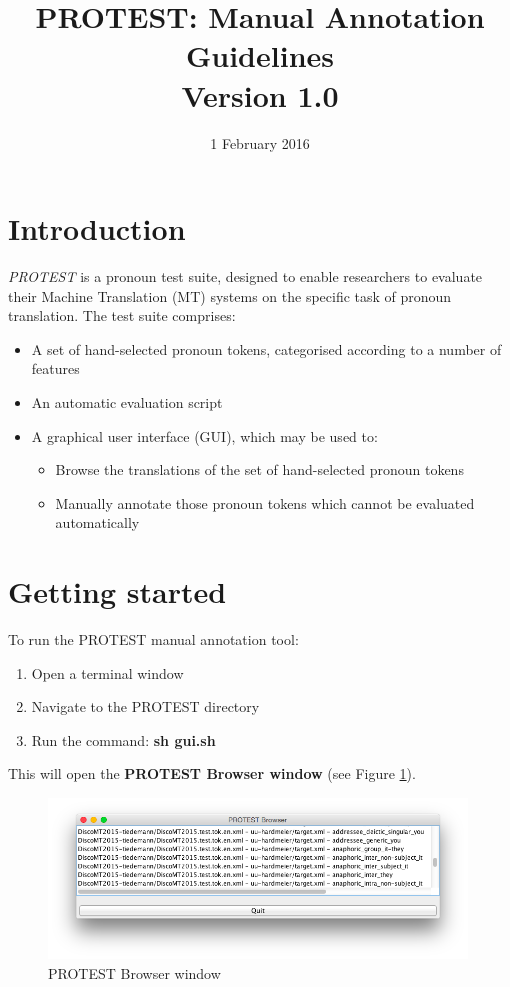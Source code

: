 \documentclass[11pt]{article} %
\title{PROTEST: Manual Annotation Guidelines\\Version 1.0}
\date{1 February 2016} %
\begin{document}
\maketitle

\section{Introduction}
\textit{PROTEST} is a pronoun test suite, designed to enable researchers to evaluate their Machine Translation (MT) systems on the specific task of pronoun translation. The test suite comprises:
\begin{itemize}
  \item A set of hand-selected pronoun tokens, categorised according to a number of features
  \item An automatic evaluation script
  \item A graphical user interface (GUI), which may be used to:
  \begin{itemize}
    \item Browse the translations of the set of hand-selected pronoun tokens
    \item Manually annotate those pronoun tokens which cannot be evaluated automatically
  \end{itemize}
\end{itemize}

\section{Getting started}
To run the PROTEST manual annotation tool:
\begin{enumerate}
  \item Open a terminal window
  \item Navigate to the PROTEST directory
  \item Run the command: \textbf{sh gui.sh}
\end{enumerate}

\noindent
This will open the \textbf{PROTEST Browser window} (see Figure \ref{fig:BrowserWindow}).

\begin{figure}[h!]
    \centering
    \includegraphics[width=0.99\textwidth]{PROTESTBrowserWindow.png}
    \caption{PROTEST Browser window}
    \label{fig:BrowserWindow}
\end{figure}
\end{document}
